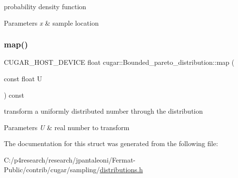 probability density function


\begin{DoxyParams}{Parameters}
{\em x} & sample location \\
\hline
\end{DoxyParams}
\mbox{\label{structcugar_1_1_bounded__pareto__distribution_a91ec0f08a9d9355ec67bd176f34a1a6c}} 
\subsubsection{\texorpdfstring{map()}{map()}}
{\footnotesize\ttfamily C\+U\+G\+A\+R\+\_\+\+H\+O\+S\+T\+\_\+\+D\+E\+V\+I\+CE float cugar\+::\+Bounded\+\_\+pareto\+\_\+distribution\+::map (\begin{DoxyParamCaption}\item[{const float}]{U }\end{DoxyParamCaption}) const\hspace{0.3cm}{\ttfamily [inline]}}

transform a uniformly distributed number through the distribution


\begin{DoxyParams}{Parameters}
{\em U} & real number to transform \\
\hline
\end{DoxyParams}


The documentation for this struct was generated from the following file\+:\begin{DoxyCompactItemize}
\item 
C\+:/p4research/research/jpantaleoni/\+Fermat-\/\+Public/contrib/cugar/sampling/\hyperlink{distributions_8h}{distributions.\+h}\end{DoxyCompactItemize}
